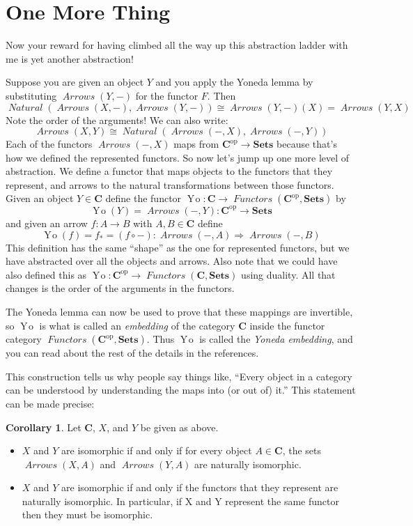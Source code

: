 \documentclass[12pt]{article}
\theoremstyle{definition}
\newtheorem{cor}[thm]{Corollary}
\theoremstyle{definition}
\theoremstyle{definition}
\numberwithin{equation}{section}
\newcommand{\op}{\mathrm{op}}           %
\newcommand{\cat}[1]{\mathbf{#1}}      %
\newcommand{\fcat}[1]{{\mathbf {#1}}}    %
\newcommand{\CC}{\cat{C}}
\DeclareMathOperator{\Arrows}{\mathit{Arrows}}
\DeclareMathOperator{\Nat}{\mathit{Natural}}
\DeclareMathOperator{\Fun}{\mathit{Functors}}
\newcommand{\Set}{\fcat{Sets}}           %
\newcommand{\iso}{\cong}                %
\newcommand{\Yo}{\mathop{Y\!o}}
\newcommand{\fto}{\Rightarrow}
\begin{document}
\section{One More Thing}

Now your reward for having climbed all the way up this abstraction ladder with me is yet
another abstraction!

Suppose you are given an object $Y$ and you apply the Yoneda lemma by substituting
$\Arrows(Y,-)$ for the functor $F$. Then
$$
\Nat(\Arrows(X, -),\Arrows(Y,-)) \iso \Arrows(Y,-)(X) = \Arrows(Y,X)
$$
Note the order of the arguments! We can also write:
$$
\Arrows(X,Y) \iso \Nat(\Arrows(-, X),\Arrows(-,Y))
$$
Each of the functors $\Arrows(-, X)$ maps from $\CC^\op \to \Set$ because that's how we
defined the represented functors. So now let's jump up one more level of abstraction. We
define a functor that maps objects to the functors that they represent, and arrows to the
natural transformations between those functors. Given an object $Y\in\CC$ define the functor
$\Yo:\CC \to \Fun(\CC^\op, \Set)$ by
$$
\Yo(Y) = \Arrows(-, Y) : \CC^\op \to \Set
$$
and given an arrow $f: A \to B$ with $A,B \in \CC$ define
$$
\Yo(f) = f_* = (f \circ -) : \Arrows(-,A) \fto \Arrows(-,B)
$$
This definition has the same ``shape'' as the one for represented functors, but we have
abstracted over all the objects and arrows. Also note that we could have also defined this
as $\Yo:\CC^\op \to \Fun(\CC, \Set)$ using duality. All that changes is the 
order of the arguments in the functors.

The Yoneda lemma can now be used to prove that these mappings are invertible, so
$\Yo$ is what is called an {\it embedding} of the category $\CC$ inside the functor
category $\Fun(\CC^\op, \Set)$. Thus $\Yo$ is called the {\it Yoneda embedding}, and you
can read about the rest of the details in the references.

This construction tells us why people say things like, ``Every object in a category can be
understood by understanding the maps into (or out of) it.''  This statement can be made precise:
\begin{cor}
Let $\CC$, $X$, and $Y$ be given as above.
\begin{itemize}
\item $X$  and $Y$ are isomorphic if and only if for every object $A \in \CC$, the sets
$\Arrows(X, A)$ and $\Arrows(Y, A)$ are naturally isomorphic.
\item $X$ and $Y$ are isomorphic if and only if the functors that they represent are
naturally isomorphic. In particular, if X and Y represent the same functor then they must
be isomorphic.
\end{itemize}
\end{cor}
\end{document}
